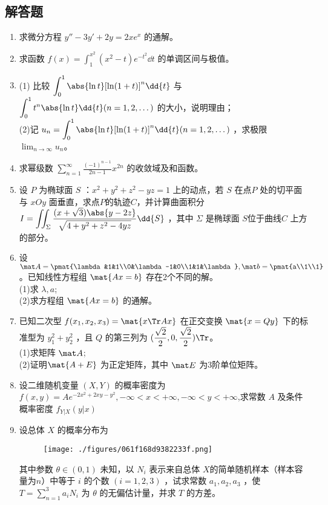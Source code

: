 \subsection{解答题}
\begin{enumerate}
\item 求微分方程 $y''-3y'+2y=2xe^x$ 的通解。
\item 求函数 $\displaystyle f(x)=\int_{1}^{x^2}(x^2-t)e^{-t^2}\dd{t}$ 的单调区间与极值。
\item (1) 比较 $\displaystyle \int_0^1 \abs{\ln t}[\ln (1+t)]^n\dd{t} $ 与  $\displaystyle \int_0^1 t^n \abs{\ln t}\dd{t} (n=1,2,\dots)$ 的大小，说明理由；\\
(2)记 $\displaystyle u_n= \int_0^1 \abs{\ln t}[\ln (1+t)]^n\dd{t} (n=1,2,\dots)$ ，求极限  $\displaystyle \lim_{n\to\infty} u_n$。
\item  求幂级数 $\displaystyle \sum_{n=1}^\infty \frac{(-1)^{n-1}}{2n-1}x^{2n}$ 的收敛域及和函数。
\item 设 $P$ 为椭球面 $S$ ：$x^2+y^2+z^2-yz=1$   上的动点，若 $S$ 在点$ P$ 处的切平面与 $xOy$ 面垂直，求点$P$的轨迹$C$，并计算曲面积分 $\displaystyle I=\iint_\Sigma \frac{(x+\sqrt{3})\abs{y-2z}}{\sqrt{4+y^2+z^2-4yz}}\dd{S}$  ，其中 $\Sigma$ 是椭球面  $S$位于曲线$ C$ 上方的部分。
\item 设 $\mat A=\pmat{\lambda &1&1\\0&\lambda-1&0\\1&1&\lambda},\mat b=\pmat{a\\1\\1}$  。已知线性方程组 $\mat {Ax=b}$ 存在2个不同的解。\\
(1)求 $\lambda,a$;\\
(2)求方程组 $\mat {Ax=b}$ 的通解。
\item 已知二次型 $f(x_1,x_2,x_3)=\mat {x \Tr Ax}$  在正交变换 $\mat {x=Qy}$ 下的标准型为 $y_1^2+y_2^2$  ，且 $Q$ 的第三列为 $\displaystyle (\frac{\sqrt{2}}{2},0,\frac{\sqrt{2}}{2})\Tr$。\\
(1)求矩阵  $\mat A$;\\
(2)证明$\mat{ A+E}$  为正定矩阵，其中 $\mat E$ 为3阶单位矩阵。
\item 设二维随机变量 $(X,Y)$ 的概率密度为 $\displaystyle f(x,y)=Ae^{-2x^2+2xy-y^2},-\infty<x<+\infty,-\infty<y<+\infty$,求常数 $A$ 及条件概率密度 $f_{Y|X}(y|x)$
\item 设总体 $X$ 的概率分布为
\begin{figure}[ht]
\centering
\texttt{[image: ./figures/061f168d9382233f.png]}
\caption{} \label{fig_PeeM10_1}
\end{figure}
其中参数 $\theta \in (0,1)$  未知，以 $N_i$ 表示来自总体 $X $的简单随机样本（样本容量为$n$）中等于 $i$ 的个数 $(i=1,2,3)$  ，试求常数  $a_1,a_2,a_3$  ，使  $\displaystyle T=\sum_{n=1}^3 a_iN_i$ 为 $\theta$  的无偏估计量，并求 $T$ 的方差。
\end{enumerate}